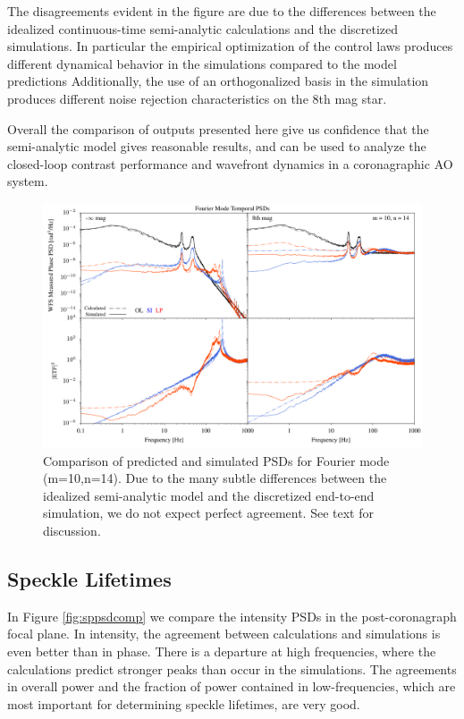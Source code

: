 \documentclass[10pt,preprint]{aastex631}
\begin{document}
The disagreements evident in the figure are due to the differences between the idealized continuous-time semi-analytic calculations and the discretized simulations. In particular the empirical optimization of the control laws produces different dynamical behavior in the simulations compared to the model predictions Additionally, the use of an orthogonalized basis in the simulation produces different noise rejection characteristics on the 8th mag star.  

Overall the comparison of outputs presented here give us confidence that the semi-analytic model gives reasonable results, and can be used to analyze the closed-loop contrast performance and wavefront dynamics in a coronagraphic AO system.

\begin{figure}
\hspace{-0.3in}
\includegraphics[width=6.5in]{psdcomp_10_14.pdf}
\caption{Comparison of predicted and simulated PSDs for Fourier mode (m=10,n=14).  Due to the many subtle differences between the idealized semi-analytic model and the discretized end-to-end simulation, we do not expect perfect agreement.  See text for discussion.    \label{fig:opd_psdcomp}}
\end{figure}


\subsection{Speckle Lifetimes}

In Figure \ref{fig:sppsdcomp} we compare the intensity PSDs in the post-coronagraph focal plane.  In intensity, the agreement between calculations and simulations is even better than in phase.  There is a departure at high frequencies, where the calculations predict stronger peaks than occur in the simulations. The agreements in overall power and the fraction of power contained in low-frequencies, which are most important for determining speckle lifetimes, are very good.
\end{document}

